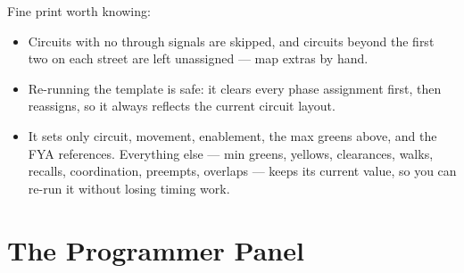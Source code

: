 \documentclass[11pt]{article}
\begin{document}
Fine print worth knowing:

\begin{itemize}[nosep]
  \item Circuits with no through signals are skipped, and circuits beyond the
        first two on each street are left unassigned — map extras by hand.
  \item Re-running the template is safe: it clears every phase assignment first,
        then reassigns, so it always reflects the current circuit layout.
  \item It sets only circuit, movement, enablement, the max greens above, and the
        FYA references. Everything else — min greens, yellows, clearances, walks,
        recalls, coordination, preempts, overlaps — keeps its current value, so
        you can re-run it without losing timing work.
\end{itemize}

\section{The Programmer Panel}\label{sec:panel}
\end{document}
